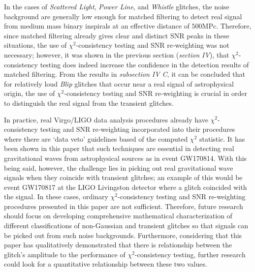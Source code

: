 \documentclass[preprint,
letterpaper,
 amsmath,amssymb,
 aps,
]{revtex4-2}
\begin{document}
In the cases of \textit{Scattered Light}, \textit{Power Line}, and \textit{Whistle} glitches, the noise background are generally low enough for matched filtering to detect  real signal from medium mass binary inspirals at an effective distance of $500$MPc. Therefore, since matched filtering already gives clear and distinct SNR peaks in these situations, the use of $\chi^2$-consistency testing and SNR re-weighting was not necessary; however, it was shown in the previous section (\textit{section IV}), that $\chi^2$-consistency testing does indeed increase the confidence in the detection results of matched filtering. From the results in \textit{subsection IV C}, it can be concluded that for relatively loud \textit{Blip} glitches that occur near a real signal of astrophysical origin, the use of $\chi^2$-consistency testing and SNR re-weighting is crucial in order to distinguish the real signal from the transient glitches.

In practice, real Virgo/LIGO data analysis procedures already have $\chi^2$-consistency testing and SNR re-weighting incorporated into their procedures where there are `data veto' guidelines based of the computed $\chi^2$ statistic. It has been shown in this paper that such techniques are essential in detecting real gravitational waves from astrophysical sources as in event GW170814. With this being said, however, the challenge lies in picking out real gravitational wave signals when they coincide with transient glitches; an example of this would be event GW170817 at the LIGO Livingston detector where a glitch coincided with the signal. In these cases, ordinary $\chi^2$-consistency testing and SNR re-weighting procedures presented in this paper are not sufficient. Therefore, future research should focus on developing comprehensive mathematical characterization of different classifications of non-Gaussian and transient glitches so that signals can be picked out from such noise backgrounds. Furthermore, considering that this paper has qualitatively demonstrated that there is relationship between the glitch's amplitude to the performance of $\chi^2$-consistency testing, further research could look for a quantitative relationship between these two values.
\end{document}
